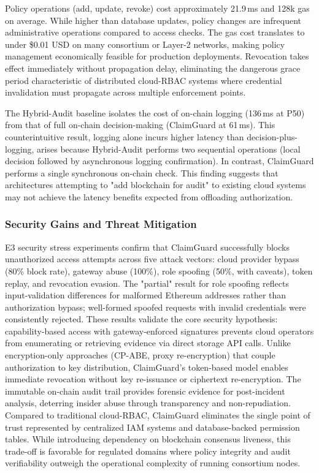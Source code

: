 \documentclass[final,5p,times,twocolumn]{elsarticle}
\begin{document}
Policy operations (add, update, revoke) cost approximately 21.9\,ms and 128k gas on average. While higher than database updates, policy changes are infrequent administrative operations compared to access checks. The gas cost translates to under \$0.01 USD on many consortium or Layer-2 networks, making policy management economically feasible for production deployments. Revocation takes effect immediately without propagation delay, eliminating the dangerous grace period characteristic of distributed cloud-RBAC systems where credential invalidation must propagate across multiple enforcement points.

The Hybrid-Audit baseline isolates the cost of on-chain logging (136\,ms at P50) from that of full on-chain decision-making (ClaimGuard at 61\,ms). This counterintuitive result, logging alone incurs higher latency than decision-plus-logging, arises because Hybrid-Audit performs two sequential operations (local decision followed by asynchronous logging confirmation). In contrast, ClaimGuard performs a single synchronous on-chain check. This finding suggests that architectures attempting to "add blockchain for audit" to existing cloud systems may not achieve the latency benefits expected from offloading authorization.

\subsubsection{Security Gains and Threat Mitigation}

E3 security stress experiments confirm that ClaimGuard successfully blocks unauthorized access attempts across five attack vectors: cloud provider bypass (80\% block rate), gateway abuse (100\%), role spoofing (50\%, with caveats), token replay, and revocation evasion. The "partial" result for role spoofing reflects input-validation differences for malformed Ethereum addresses rather than authorization bypass; well-formed spoofed requests with invalid credentials were consistently rejected. These results validate the core security hypothesis: capability-based access with gateway-enforced signatures prevents cloud operators from enumerating or retrieving evidence via direct storage API calls. Unlike encryption-only approaches (CP-ABE, proxy re-encryption) that couple authorization to key distribution, ClaimGuard's token-based model enables immediate revocation without key re-issuance or ciphertext re-encryption. The immutable on-chain audit trail provides forensic evidence for post-incident analysis, deterring insider abuse through transparency and non-repudiation. Compared to traditional cloud-RBAC, ClaimGuard eliminates the single point of trust represented by centralized IAM systems and database-backed permission tables. While introducing dependency on blockchain consensus liveness, this trade-off is favorable for regulated domains where policy integrity and audit verifiability outweigh the operational complexity of running consortium nodes.
\end{document}
